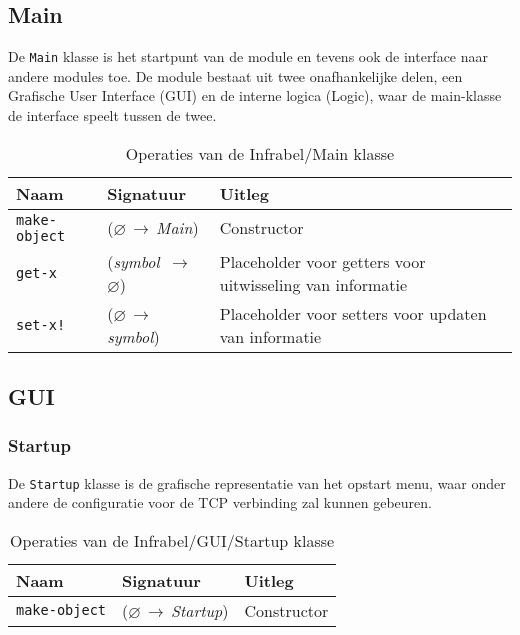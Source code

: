 \documentclass[a4paper, 11pt]{article}
\newcommand{\naar}{\,$\rightarrow$\,}
\renewcommand{\empty}{$\varnothing$}
\newcommand{\<}{\scriptsize\textless\normalsize}
\renewcommand{\>}{\scriptsize\textgreater\normalsize}
\begin{document}
\subsection{Main} %
De \texttt{Main} klasse is het startpunt van de module en tevens ook de interface naar andere modules toe. De module bestaat uit twee onafhankelijke delen, een Grafische User Interface (GUI) en de interne logica (Logic), waar de main-klasse de interface speelt tussen de twee.
\begin{table}[H]
	\begin{center}
		\begin{tabular}{|l l l|}
			\hline
			\textbf{Naam} & \textbf{Signatuur} & \textbf{Uitleg}\\
			\hline
			\texttt{make-object} & (\empty \naar \textit{Main}) & Constructor\\
			\hline
			\texttt{get-x} & (\textit{symbol} \naar \empty) & Placeholder voor getters voor uitwisseling van informatie\\
			\texttt{set-x!} & (\empty \naar \textit{symbol}) & Placeholder voor setters voor updaten van informatie\\
			\hline
		\end{tabular}
		\caption{Operaties van de Infrabel/Main klasse}
	\end{center}
\end{table}

\subsection{GUI} %

\subsubsection{Startup} %
De \texttt{Startup} klasse is de grafische representatie van het opstart menu, waar onder andere de configuratie voor de TCP verbinding zal kunnen gebeuren.
\begin{table}[H]
	\begin{center}
		\begin{tabular}{|l l l|}
			\hline
			\textbf{Naam} & \textbf{Signatuur} & \textbf{Uitleg}\\
			\hline
			\texttt{make-object} & (\empty \naar \textit{Startup}) & Constructor\\
			\hline
		\end{tabular}
		\caption{Operaties van de Infrabel/GUI/Startup klasse}
	\end{center}
\end{table}
\end{document}
